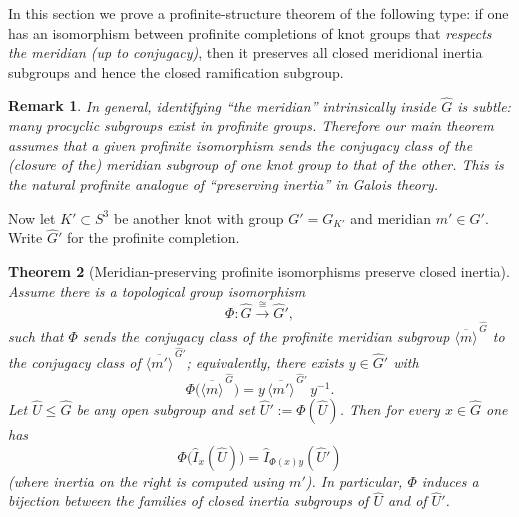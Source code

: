 \documentclass[11pt]{article}
\newtheorem{theorem}{Theorem}[section]
\newtheorem{remark}[theorem]{Remark}
\begin{document}
	In this section we prove a profinite-structure theorem of the following type: if one has an isomorphism between profinite completions of knot groups that \emph{respects the meridian (up to conjugacy)}, then it preserves all closed meridional inertia subgroups and hence the closed ramification subgroup.
	
	\begin{remark}
		In general, identifying ``the meridian'' intrinsically inside $\widehat G$ is subtle: many procyclic subgroups exist in profinite groups. Therefore our main theorem assumes that a given profinite isomorphism sends the conjugacy class of the (closure of the) meridian subgroup of one knot group to that of the other. This is the natural profinite analogue of ``preserving inertia'' in Galois theory.
	\end{remark}
	
	Now let $K'\subset S^3$ be another knot with group $G'=G_{K'}$ and meridian $m'\in G'$. Write $\widehat G'$ for the profinite completion.
	
	\begin{theorem}[Meridian-preserving profinite isomorphisms preserve closed inertia]\label{thm:profinite-inertia-rigidity}
		Assume there is a topological group isomorphism
		\[\Phi:\widehat G \xrightarrow{\ \cong\ } \widehat G',\] such that $\Phi$ sends the conjugacy class of the profinite meridian subgroup $\overline{\langle m\rangle}^{\,\widehat G}$ to the conjugacy class of $\overline{\langle m'\rangle}^{\,\widehat G'}$; equivalently, there exists $y\in \widehat G'$ with
		\[ \Phi\big(\overline{\langle m\rangle}^{\,\widehat G}\big)= y\,\overline{\langle m'\rangle}^{\,\widehat G'}\,y^{-1}.\]
		Let $\widehat U\le \widehat G$ be any open subgroup and set $\widehat U':=\Phi(\widehat U)$.
		Then for every $x\in \widehat G$ one has
		\[ \Phi\big(\widehat I_x(\widehat U)\big)=\widehat I_{\Phi(x)y}(\widehat U')\]
		(where inertia on the right is computed using $m'$). In particular, $\Phi$ induces a bijection between the families of closed inertia subgroups of $\widehat U$ and of $\widehat U'$.
	\end{theorem}
	
\end{document}
